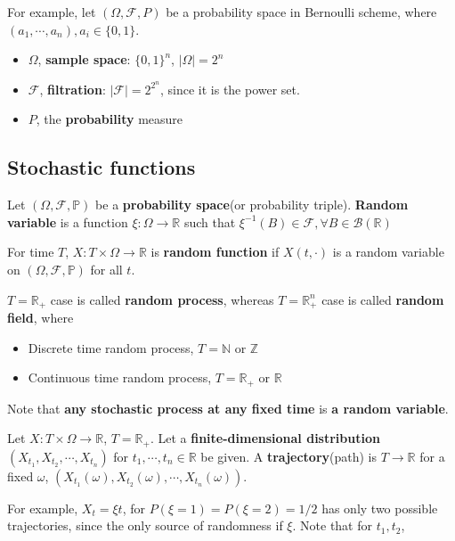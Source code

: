 \documentclass[12pt]{article}
\theoremstyle{nonumberbreak}
\begin{document}
For example, let $(\Omega, \mathcal{F}, P)$ be a probability space in Bernoulli scheme, where $(a_1, \cdots, a_n), a_i \in \{0,1\}$.

\begin{itemize}
	\item $\Omega$, \textbf{sample space}: $\{0,1 \}^n$, $|\Omega| = 2^n$
	\item $\mathcal{F}$, \textbf{filtration}: $|\mathcal{F}| = 2^{2^n}$, since it is the power set.
	\item $P$, the \textbf{probability} measure
\end{itemize}



\subsection{Stochastic functions}


Let $(\Omega, \mathcal{F}, \mathbb{P})$ be a \textbf{probability space}(or probability triple). \textbf{Random variable} is a function $\xi : \Omega \to \mathbb{R} $ such that $\xi^{-1} (B) \in \mathcal{F}, \forall B \in \mathcal{B}(\mathbb{R})$


For time $T$, $X : T \times \Omega \to \mathbb{R}$ is \textbf{random function} if $X(t, \cdot)$ is a random variable on $(\Omega, \mathcal{F}, \mathbb{P})$ for all $t$.


$T = \mathbb{R}_{+}$ case is called \textbf{random process}, whereas $T = \mathbb{R}_{+}^n$ case is called \textbf{random field}, where

\begin{itemize}
	\item Discrete time random process, $T = \mathbb{N}$ or $\mathbb{Z} $
	\item Continuous time random process, $T = \mathbb{R}_{+}$ or $\mathbb{R} $
\end{itemize}

Note that \textbf{any stochastic process at any fixed time} is \textbf{a random variable}. 

Let $X : T \times \Omega \to \mathbb{R}$, $T = \mathbb{R}_{+}$. Let a \textbf{finite-dimensional distribution} $(X_{t_1}, X_{t_2}, \cdots, X_{t_n})$ for $t_1, \cdots, t_n \in \mathbb{R}$ be given. A \textbf{trajectory}(path) is $T \to \mathbb{R}$ for a fixed $\omega$, $(X_{t_1}(\omega), X_{t_2}(\omega), \cdots, X_{t_n}(\omega))$.

For example, $X_t = \xi t$, for $P(\xi = 1) = P(\xi = 2) = 1/2$ has only two possible trajectories, since the only source of randomness if $\xi$. Note that for $t_1, t_2$, 
\end{document}
